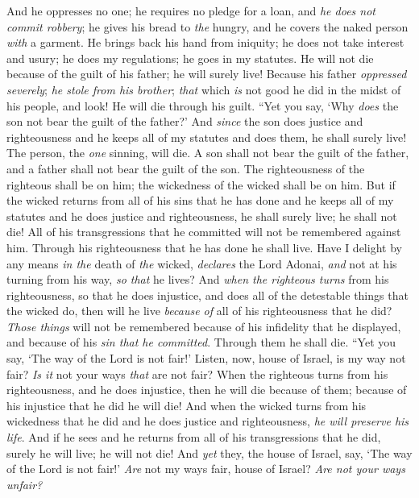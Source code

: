 \begin{biblechapter}
\verse And he oppresses no one; he requires no pledge for a loan, and \textit{he does not commit robbery}; he gives his bread to \textit{the} hungry, and he covers the naked person \textit{with} a garment.
\verse He brings back his hand from iniquity; he does not take interest and usury; he does my regulations; he goes in my statutes. He will not die because of the guilt of his father; he will surely live!
\verse Because his father \textit{oppressed severely}; \textit{he stole from his brother}; \textit{that} which \textit{is} not good he did in the midst of his people, and look! He will die through his guilt.
\verse “Yet you say, ‘Why \textit{does} the son not bear the guilt of the father?’ And \textit{since} the son does justice and righteousness and he keeps all of my statutes and does them, he shall surely live!
\verse The person, the \textit{one} sinning, will die. A son shall not bear the guilt of the father, and a father shall not bear the guilt of the son. The righteousness of the righteous shall be on him; the wickedness of the wicked shall be on him.
\verse But if the wicked returns from all of his sins that he has done and he keeps all of my statutes and he does justice and righteousness, he shall surely live; he shall not die!
\verse All of his transgressions that he committed will not be remembered against him. Through his righteousness that he has done he shall live.
\verse Have I delight by any means \textit{in the} death of \textit{the} wicked, \textit{declares} the Lord Adonai, \textit{and} not at his turning from his way, \textit{so that} he lives?
\verse And \textit{when the righteous turns} from his righteousness, so that he does injustice, and does all of the detestable things that the wicked do, then will he live \textit{because of} all of his righteousness that he did? \textit{Those things} will not be remembered because of his infidelity that he displayed, and because of his \textit{sin that he committed}. Through them he shall die.
\verse “Yet you say, ‘The way of the Lord is not fair!’ Listen, now, house of Israel, is my way not fair? \textit{Is it} not your ways \textit{that} are not fair?
\verse When the righteous turns from his righteousness, and he does injustice, then he will die because of them; because of his injustice that he did he will die!
\verse And when the wicked turns from his wickedness that he did and he does justice and righteousness, \textit{he will preserve his life}.
\verse And if he sees and he returns from all of his transgressions that he did, surely he will live; he will not die!
\verse And \textit{yet} they, the house of Israel, say, ‘The way of the Lord is not fair!’ \textit{Are} not my ways fair, house of Israel? \textit{Are not your ways unfair?}

\end{biblechapter}
